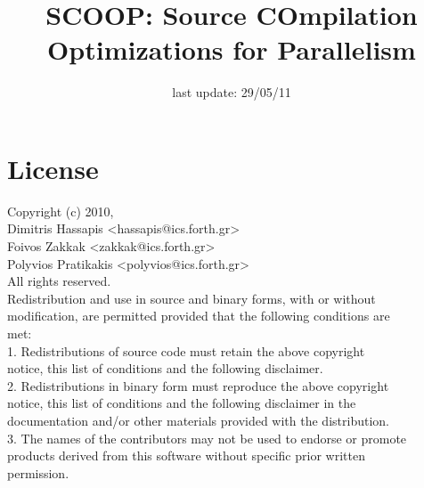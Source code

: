 \documentclass[letterpaper]{article}
\begin{document}
\title{SCOOP: Source COmpilation Optimizations for Parallelism \scoopversion}
\date{last update: 29/05/11}
\maketitle

\section{License}

Copyright (c) 2010, \\
 Dimitris Hassapis  <hassapis@ics.forth.gr>\\
 Foivos Zakkak        <zakkak@ics.forth.gr>\\
 Polyvios Pratikakis  <polyvios@ics.forth.gr>\\
All rights reserved.\\

Redistribution and use in source and binary forms, with or without\\
modification, are permitted provided that the following conditions are\\
met:\\

1. Redistributions of source code must retain the above copyright\\
notice, this list of conditions and the following disclaimer.\\

2. Redistributions in binary form must reproduce the above copyright\\
notice, this list of conditions and the following disclaimer in the\\
documentation and/or other materials provided with the distribution.\\

3. The names of the contributors may not be used to endorse or promote\\
products derived from this software without specific prior written\\
permission.\\
\end{document}
